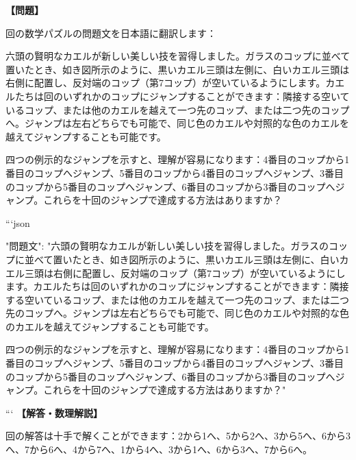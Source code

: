 \documentclass[10pt,a4paper,oneside,openany]{ltjsbook}
\begin{document}
\begin{tcolorbox}[colback=softblue,colframe=primaryblue,title=\textbf{第 216 問：THE EDUCATED FROGS.},arc=2mm,boxrule=1pt,breakable]
\textbf{【問題】}\par\vspace{0.3em}
回の数学パズルの問題文を日本語に翻訳します：

六頭の賢明なカエルが新しい美しい技を習得しました。ガラスのコップに並べて置いたとき、如き図所示のように、黒いカエル三頭は左側に、白いカエル三頭は右側に配置し、反対端のコップ（第7コップ）が空いているようにします。カエルたちは回のいずれかのコップにジャンプすることができます：隣接する空いているコップ、または他のカエルを越えて一つ先のコップ、または二つ先のコップへ。ジャンプは左右どちらでも可能で、同じ色のカエルや対照的な色のカエルを越えてジャンプすることも可能です。

四つの例示的なジャンプを示すと、理解が容易になります：4番目のコップから1番目のコップへジャンプ、5番目のコップから4番目のコップへジャンプ、3番目のコップから5番目のコップへジャンプ、6番目のコップから3番目のコップへジャンプ。これらを十回のジャンプで達成する方法はありますか？

```json
{
  "問題文": "六頭の賢明なカエルが新しい美しい技を習得しました。ガラスのコップに並べて置いたとき、如き図所示のように、黒いカエル三頭は左側に、白いカエル三頭は右側に配置し、反対端のコップ（第7コップ）が空いているようにします。カエルたちは回のいずれかのコップにジャンプすることができます：隣接する空いているコップ、または他のカエルを越えて一つ先のコップ、または二つ先のコップへ。ジャンプは左右どちらでも可能で、同じ色のカエルや対照的な色のカエルを越えてジャンプすることも可能です。

四つの例示的なジャンプを示すと、理解が容易になります：4番目のコップから1番目のコップへジャンプ、5番目のコップから4番目のコップへジャンプ、3番目のコップから5番目のコップへジャンプ、6番目のコップから3番目のコップへジャンプ。これらを十回のジャンプで達成する方法はありますか？"
}
```
\tcblower
\textbf{【解答・数理解説】}\par\vspace{0.3em}
回の解答は十手で解くことができます：2から1へ、5から2へ、3から5へ、6から3へ、7から6へ、4から7へ、1から4へ、3から1へ、6から3へ、7から6へ。
\end{tcolorbox}
\end{document}
